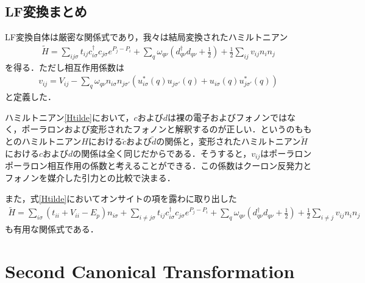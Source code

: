 \documentclass[a4j]{jarticle}
\begin{document}
\subsection{ LF変換まとめ}
LF変換自体は厳密な関係式であり，我々は結局変換されたハミルトニアン
\begin{align}
 \tilde{H}=\sum_{ij\sigma}t_{ij}c^{\dagger}_{i\sigma}c_{j\sigma}e^{P_j-P_i}+\sum_{q}\omega_{q\nu}\left(d^{\dagger}_{q\nu}d_{q\nu}+\frac{1}{2}\right)+\frac{1}{2}\sum_{ij}v_{ij}n_{i}n_{j}\label{Htilde}
\end{align}
を得る．ただし相互作用係数は
\begin{align}
 v_{ij}=V_{ij}-\sum_{q}\omega_{q\nu} n_{i\sigma} n_{j\sigma'}\left(u_{i\sigma}^*(q)u_{j\sigma'}(q)+u_{i\sigma}(q)u_{j\sigma'}^*(q)\right)\label{v}
\end{align}
と定義した．

ハミルトニアン\eqref{Htilde}において，$c$および$d$は裸の電子およびフォノンではなく，ポーラロンおよび変形されたフォノンと解釈するのが正しい．というのももとのハミルトニアン$H$における$\tilde{c}$および$\tilde{d}$の関係と，変形されたハミルトニアン$\tilde{H}$における$c$および$d$の関係は全く同じだからである．そうすると，$v_{ij}$はポーラロンポーラロン相互作用の係数と考えることができる．この係数はクーロン反発力とフォノンを媒介した引力との比較で決まる．

また，式\eqref{Htilde}においてオンサイトの項を露わに取り出した
\begin{align}
  \tilde{H}=\sum_{i\sigma}\left(t_{ii}+V_{ii}-E_p\right)n_{i\sigma}+\sum_{i\neq j\sigma}t_{ij}c^{\dagger}_{i\sigma}c_{j\sigma}e^{P_j-P_i}+\sum_{q}\omega_{q\nu}\left(d^{\dagger}_{q\nu}d_{q\nu}+\frac{1}{2}\right)+\frac{1}{2}\sum_{i\neq j}v_{ij}n_{i}n_{j}
\end{align}
も有用な関係式である．






\section{Second Canonical Transformation}
\end{document}
